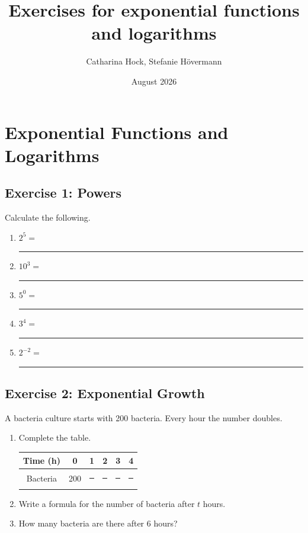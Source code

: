 \documentclass[a4paper, 11pt]{article}
\title{Exercises for exponential functions and logarithms}
\author{Catharina Hock, Stefanie Hövermann}
\date{August  2026}
\begin{document}
\maketitle 

\section*{Exponential Functions and Logarithms}

\subsection*{Exercise 1: Powers}

Calculate the following.

\begin{enumerate}
    \item $2^5=$ \rule{2cm}{0.4pt}
    \item $10^3=$ \rule{2cm}{0.4pt}
    \item $5^0=$ \rule{2cm}{0.4pt}
    \item $3^4=$ \rule{2cm}{0.4pt}
    \item $2^{-2}=$ \rule{2cm}{0.4pt}
\end{enumerate}

\vspace{0.5cm}

\subsection*{Exercise 2: Exponential Growth}

A bacteria culture starts with 200 bacteria. Every hour the number doubles.

\begin{enumerate}
    \item Complete the table.

    \begin{center}
    \begin{tabular}{c|ccccc}
        Time (h) & 0 & 1 & 2 & 3 & 4\\
        \hline
        Bacteria & 200 & \rule{1cm}{0.4pt} &
        \rule{1cm}{0.4pt} &
        \rule{1cm}{0.4pt} &
        \rule{1cm}{0.4pt}
    \end{tabular}
    \end{center}

    \item Write a formula for the number of bacteria after $t$ hours.

    \vspace{1cm}

    \item How many bacteria are there after 6 hours?

    \vspace{1cm}
\end{enumerate}
\end{document}
